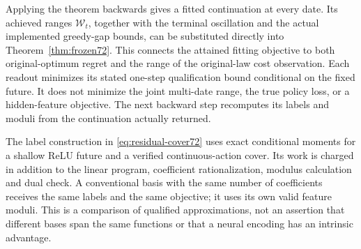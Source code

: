 Applying the theorem backwards gives a fitted continuation at every date. Its achieved ranges $\mathcal W_t$, together with the terminal oscillation and the actual implemented greedy-gap bounds, can be substituted directly into Theorem~\ref{thm:frozen72}. This connects the attained fitting objective to both original-optimum regret and the range of the original-law cost observation. Each readout minimizes its stated one-step qualification bound conditional on the fixed future. It does not minimize the joint multi-date range, the true policy loss, or a hidden-feature objective. The next backward step recomputes its labels and moduli from the continuation actually returned.

The label construction in \eqref{eq:residual-cover72} uses exact conditional moments for a shallow ReLU future and a verified continuous-action cover. Its work is charged in addition to the linear program, coefficient rationalization, modulus calculation and dual check. A conventional basis with the same number of coefficients receives the same labels and the same objective; it uses its own valid feature moduli. This is a comparison of qualified approximations, not an assertion that different bases span the same functions or that a neural encoding has an intrinsic advantage.
